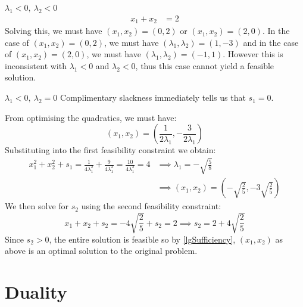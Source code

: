 \documentclass[../main.tex]{subfiles}
\begin{document}
\begin{example}
\begin{proofcases}
\begin{case}{$\lambda_1 < 0,\ \lambda_2 < 0$}
\begin{align*}
        x_1 + x_2 &= 2
      \end{align*}
      Solving this, we must have $(x_1, x_2) = (0, 2)$ or $(x_1, x_2) = (2, 0)$.
      In the case of $(x_1, x_2) = (0, 2)$, we must have $(\lambda_1, \lambda_2) = (1, -3)$ and in the case of $(x_1, x_2) = (2, 0)$, we must have $(\lambda_1, \lambda_2) = (-1, 1)$.
      However this is inconsistent with $\lambda_1 < 0$ and $\lambda_2 < 0$, thus this case cannot yield a feasible solution.
    \end{case}
    \begin{case}{$\lambda_1 < 0,\ \lambda_2 = 0$}
      Complimentary slackness immediately tells us that $s_1 = 0$.

      From optimising the quadratics, we must have:
      \[
        (x_1, x_2) = \left(\frac{1}{2\lambda_1}, -\frac{3}{2 \lambda_1}\right)
      \]
      Substituting into the first feasibility constraint we obtain:
      \begin{align*}
        x^2_1 + x^2_2 + s_1 = \frac{1}{4\lambda^2_1} + \frac{9}{4 \lambda^2_1} = \frac{10}{4\lambda^2_1} = 4 &\implies \lambda_1 = - \sqrt{\frac{5}{8}} \\
                                                                                                             &\implies (x_1, x_2) = \left(-\sqrt{\frac{2}{5}}, -3 \sqrt{\frac{2}{5}}\right)
      \end{align*}
      We then solve for $s_2$ using the second feasibility constraint:
      \[
        x_1 + x_2 + s_2 = -4 \sqrt{\frac{2}{5}} + s_2 = 2 \implies s_2 = 2 + 4\sqrt{\frac{2}{5}}
      \]
      Since $s_2 > 0$, the entire solution is feasible so by \cref{lgSufficiency}, $(x_1, x_2)$ as above is an optimal solution to the original problem.
    \end{case}
  \end{proofcases}
\end{example}
\section{Duality} \label{dualitySec}
\end{document}
